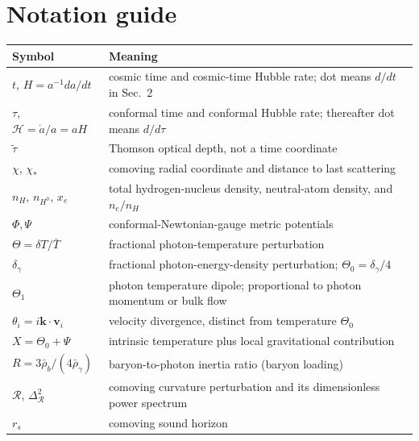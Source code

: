 \documentclass[12pt]{article}
\newcommand{\Hs}{\mathcal H}
\newcommand{\Rs}{\mathcal R}
\newcommand{\bk}{\mathbf k}
\newcommand{\bv}{\mathbf v}
\begin{document}
\section*{Notation guide}
\begin{center}
\begin{tabular}{@{}p{.33\linewidth}p{.62\linewidth}@{}}\toprule
Symbol & Meaning\\ \midrule
$t$, $H=a^{-1}da/dt$ & cosmic time and cosmic-time Hubble rate; dot means $d/dt$ in Sec.~2\\
$\tau$, $\Hs=\dot a/a=aH$ & conformal time and conformal Hubble rate; thereafter dot means $d/d\tau$\\
$\tilde\tau$ & Thomson optical depth, not a time coordinate\\
$\chi$, $\chi_*$ & comoving radial coordinate and distance to last scattering\\
$n_H$, $n_{H^0}$, $x_e$ & total hydrogen-nucleus density, neutral-atom density, and $n_e/n_H$\\
$\Phi,\Psi$ & conformal-Newtonian-gauge metric potentials\\
$\Theta=\delta T/\bar T$ & fractional photon-temperature perturbation\\
$\delta_\gamma$ & fractional photon-energy-density perturbation; $\Theta_0=\delta_\gamma/4$\\
$\Theta_1$ & photon temperature dipole; proportional to photon momentum or bulk flow\\
$\theta_i=i\bk\cdot\bv_i$ & velocity divergence, distinct from temperature $\Theta_0$\\
$X=\Theta_0+\Psi$ & intrinsic temperature plus local gravitational contribution\\
$R=3\bar\rho_b/(4\bar\rho_\gamma)$ & baryon-to-photon inertia ratio (baryon loading)\\
$\Rs$, $\Delta_{\Rs}^2$ & comoving curvature perturbation and its dimensionless power spectrum\\
$r_s$ & comoving sound horizon\\ \bottomrule
\end{tabular}
\end{center}
\end{document}
